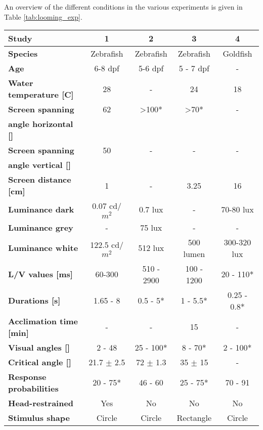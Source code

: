 \documentclass[a4paper,10pt,hidelinks]{scrreprt}
\begin{document}
	An overview of the different conditions in the various experiments is given in Table 
	\ref{tab:looming_exp}.\\
	\begin{table} [!th]
		\begin{center}
			\begin{tabular}{l|c|c|c|c}
				\textbf{Study} & \textbf{1} & \textbf{2} & \textbf{3} & \textbf{4}\\
				\hline
				\textbf{Species} & Zebrafish & Zebrafish & Zebrafish & Goldfish\\
				\textbf{Age} & 6-8 dpf & 5-6 dpf & 5 - 7 dpf & -\\
				\textbf{Water temperature [\textdegree C]} & 28  & - & 24  & 18 \\
				\textbf{Screen spanning} & 62 & >100* & >70* & -\\
				\textbf{angle horizontal [\textdegree]} & & & & \\
				\textbf{Screen spanning} & 50 & - & - & -\\
				\textbf{angle vertical [\textdegree]} & & & & \\
				\textbf{Screen distance [cm]} & 1 & - & 3.25 & 16\\
				\textbf{Luminance dark} & 0.07 cd/$m^2$ & 0.7 lux & - & 70-80 lux\\
				\textbf{Luminance grey} & - & 75 lux & - & -\\
				\textbf{Luminance white} & 122.5 cd/$m^2$ & 512 lux & 500 lumen & 300-320 lux\\
				\textbf{L/V values [ms]} & 60-300 \dag & 510 - 2900 \dag & 100 - 
				1200 & 20 - 110*\\
				\textbf{Durations [s]} & 1.65 - 8 & 0.5 - 5* & 1 - 5.5* & 0.25 - 0.8*\\
				\textbf{Acclimation time [min]} & - & - & 15 & -\\
				\textbf{Visual angles [\textdegree]} & 2 - 48 & 25 - 100* & 8 - 70* & 2 - 100*\\
				\textbf{Critical angle [\textdegree]} & 21.7 $\pm$ 2.5 & 72 $\pm$ 1.3 & 35 $\pm$ 15 
				& -\\
				\textbf{Response probabilities} & 20 - 75* & 46 - 60 & 25 - 75* & 70 - 91\\
				\textbf{Head-restrained} & Yes & No & No & No\\
				\textbf{Stimulus shape} & Circle & Circle & Rectangle & Circle\\

\end{tabular}
\end{center}
\end{table}
\end{document}
